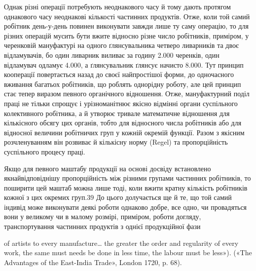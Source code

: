  Однак різні операції потребують неоднакового часу й тому
дають протягом однакового часу неоднакові кількості частинних
продуктів. Отже, коли той самий робітник день-у-день повинен
виконувати завжди лише ту саму операцію, то для різних
операцій мусить бути вжите відносно різне число робітників,
приміром, у черенковій мануфактурі на одного ґлянсувальника
четверо ливарників та двоє відламувачів, бо один ливарник виливає
за годину 2.000 черенків, один відламувач одламує 4.000, а
ґлянсувальник ґлянсує начисто 8.000. Тут принцип кооперації
повертається назад до своєї найпростішої форми, до одночасного
вживання багатьох робітників, що роблять однорідну роботу,
але цей принцип стає тепер виразом певного органічного відношення.
Отже, мануфактурний поділ праці не тільки спрощує
і урізноманітнює якісно відмінні органи суспільного колективного
робітника, а й утворює тривале математичне відношення
для кількісного обсягу цих органів, тобто для відносного числа
робітників або для відносної величини робітничих груп у кожній
окремій функції. Разом з якісним розчленуванням він розвиває
й кількісну норму (Regel) та пропорційність суспільного процесу
праці.

Якщо для певного маштабу продукції на основі досвіду встановлено
якнайвідповіднішу пропорційність між різними групами
частинних робітників, то поширити цей маштаб можна лише тоді,
коли вжити кратну кількість робітників кожної з цих окремих
груп.39 До цього долучається ще й те, що той самий індивід може
виконувати деякі роботи однаково добре, все одно, чи провадяться
вони у великому чи в малому розмірі, приміром, роботи догляду,
транспортування частинних продуктів з однієї продукційної фази

of artists to every manufacture\dots{} the greater the order and regularity of
every work, the same must needs be done in less time, the labour must
be less»). («The Advantages of the East-India Trade», London 1720, p. 68).
\parbreak{}  %
